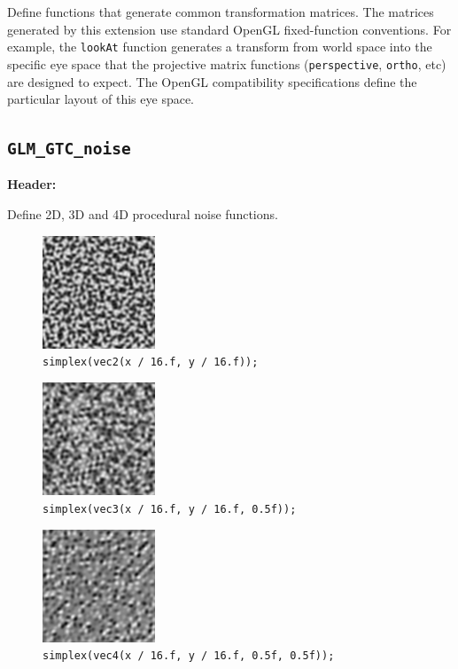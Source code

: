 \documentclass{scrartcl}
\numberwithin{figure}{subsection}
\begin{document}
Define functions that generate common transformation matrices.
The matrices generated by this extension use standard OpenGL fixed-function conventions. For example, the \verb|lookAt| function generates a transform from world space into the specific eye space that the projective matrix functions (\verb|perspective|, \verb|ortho|, etc) are designed to expect. The OpenGL compatibility specifications define the particular layout of this eye space.

\subsection{\texttt{GLM\_GTC\_noise}}
\textbf{Header:} 

Define 2D, 3D and 4D procedural noise functions.

\begin{figure}
  \centering
  \includegraphics[width=0.3\textwidth]{simplex1}
  \cprotect\caption{\verb|simplex(vec2(x / 16.f, y / 16.f));|}
\end{figure}

\begin{figure}
  \centering
  \includegraphics[width=0.3\textwidth]{simplex2}
  \cprotect\caption{\verb|simplex(vec3(x / 16.f, y / 16.f, 0.5f));|}
\end{figure}

\begin{figure}
  \centering
  \includegraphics[width=0.3\textwidth]{simplex3}
  \cprotect\caption{\verb|simplex(vec4(x / 16.f, y / 16.f, 0.5f, 0.5f));|}
\end{figure}
\end{document}
